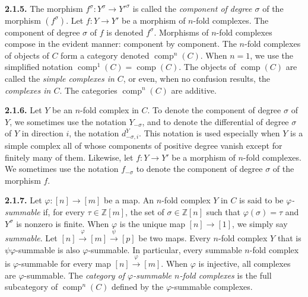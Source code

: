 %
\noindent\textbf{2.1.5.}\quad
The morphism $f^\sigma\colon Y^\sigma\longrightarrow Y'^\sigma$ is called
the \emph{component of degree $\sigma$} of the morphism $(f^\sigma)$. Let
$f\colon Y\longrightarrow Y'$ be a morphism of $n$-fold complexes. The
component of degree $\sigma$ of $f$ is denoted $f^\sigma$.
Morphisms of $n$-fold complexes compose in the evident manner: component by
component.
The $n$-fold complexes of objects of $C$ form a category denoted
$\operatorname{comp}^{n}(C)$. When $n=1$, we use the simplified notation
$\operatorname{comp}^{1}(C)=\operatorname{comp}(C)$. The objects of
$\operatorname{comp}(C)$ are called the \emph{simple complexes in $C$}, or
even, when no confusion results, the \emph{complexes in $C$}. The categories
$\operatorname{comp}^{n}(C)$ are additive.

\noindent\textbf{2.1.6.}\quad
Let $Y$ be an $n$-fold complex in $C$. To denote the component of degree
$\sigma$ of $Y$, we sometimes use the notation $Y_{-\sigma}$, and to denote
the differential of degree $\sigma$ of $Y$ in direction $i$, the notation
$d^Y_{-\sigma,i}$.
This notation is used especially when $Y$ is a simple complex all of whose
components of positive degree vanish except for finitely many of them.
Likewise, let $f\colon Y\longrightarrow Y'$ be a morphism of $n$-fold
complexes. We sometimes use the notation $f_{-\sigma}$ to denote the
component of degree $\sigma$ of the morphism $f$.

\noindent\textbf{2.1.7.}\quad
Let $\varphi\colon[n]\longrightarrow[m]$ be a map.
An $n$-fold complex $Y$ in $C$ is said to be \emph{$\varphi$-summable} if,
for every $\tau\in\mathbb Z[m]$, the set of $\sigma\in\mathbb Z[n]$ such
that $\varphi(\sigma)=\tau$ and $Y^\sigma$ is nonzero is finite. When
$\varphi$ is the unique map $[n]\longrightarrow[1]$, we simply say
\emph{summable}.
Let $[n]\xrightarrow{\varphi}[m]\xrightarrow{\psi}[p]$ be two maps. Every
$n$-fold complex $Y$ that is $\psi\varphi$-summable is also
$\varphi$-summable. In particular, every summable $n$-fold complex is
$\varphi$-summable for every map $[n]\xrightarrow{\varphi}[m]$.
When $\varphi$ is injective, all complexes are $\varphi$-summable.
The \emph{category of $\varphi$-summable $n$-fold complexes} is the full
subcategory of $\operatorname{comp}^{n}(C)$ defined by the
$\varphi$-summable complexes.

